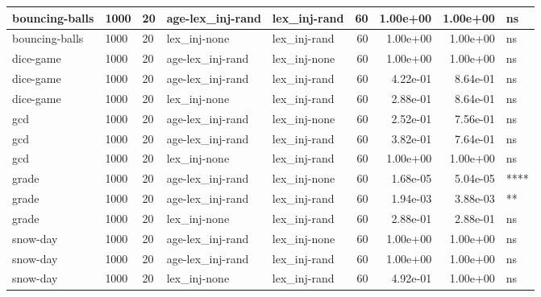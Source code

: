 \documentclass[
]{book}
\begin{document}
\begin{table}
\begin{tabular}[t]{l|l|l|l|l|r|r|r|l}
bouncing-balls & 1000 & 20 & age-lex\_inj-rand & lex\_inj-rand & 60 & 1.00e+00 & 1.00e+00 & ns\\
\hline
bouncing-balls & 1000 & 20 & lex\_inj-none & lex\_inj-rand & 60 & 1.00e+00 & 1.00e+00 & ns\\
\hline
dice-game & 1000 & 20 & age-lex\_inj-rand & lex\_inj-none & 60 & 1.00e+00 & 1.00e+00 & ns\\
\hline
dice-game & 1000 & 20 & age-lex\_inj-rand & lex\_inj-rand & 60 & 4.22e-01 & 8.64e-01 & ns\\
\hline
dice-game & 1000 & 20 & lex\_inj-none & lex\_inj-rand & 60 & 2.88e-01 & 8.64e-01 & ns\\
\hline
gcd & 1000 & 20 & age-lex\_inj-rand & lex\_inj-none & 60 & 2.52e-01 & 7.56e-01 & ns\\
\hline
gcd & 1000 & 20 & age-lex\_inj-rand & lex\_inj-rand & 60 & 3.82e-01 & 7.64e-01 & ns\\
\hline
gcd & 1000 & 20 & lex\_inj-none & lex\_inj-rand & 60 & 1.00e+00 & 1.00e+00 & ns\\
\hline
grade & 1000 & 20 & age-lex\_inj-rand & lex\_inj-none & 60 & 1.68e-05 & 5.04e-05 & ****\\
\hline
grade & 1000 & 20 & age-lex\_inj-rand & lex\_inj-rand & 60 & 1.94e-03 & 3.88e-03 & **\\
\hline
grade & 1000 & 20 & lex\_inj-none & lex\_inj-rand & 60 & 2.88e-01 & 2.88e-01 & ns\\
\hline
snow-day & 1000 & 20 & age-lex\_inj-rand & lex\_inj-none & 60 & 1.00e+00 & 1.00e+00 & ns\\
\hline
snow-day & 1000 & 20 & age-lex\_inj-rand & lex\_inj-rand & 60 & 1.00e+00 & 1.00e+00 & ns\\
\hline
snow-day & 1000 & 20 & lex\_inj-none & lex\_inj-rand & 60 & 4.92e-01 & 1.00e+00 & ns\\
\hline
\end{tabular}
\end{table}

  
\end{document}
